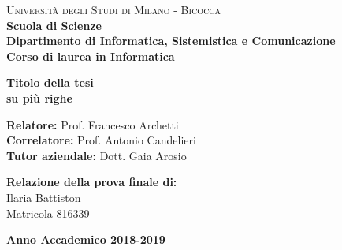 \documentclass[a4paper,12pt]{report}
\begin{document}
	
	\begin{titlepage}
		
		\begin{minipage}[t]{0.19\textwidth}
		\end{minipage}
		\begin{minipage}[t]{0.81\textwidth}
			{
				{\textsc{Università degli Studi di Milano - Bicocca}} \\
				\textbf{Scuola di Scienze} \\
				\textbf{Dipartimento di Informatica, Sistemistica e Comunicazione} \\
				\textbf{Corso di laurea in Informatica} \\
				\par
			}
		\end{minipage}
		
		\vspace{40mm}
		
		\begin{center}
			{\LARGE{
					\textbf{Titolo della tesi \\ su più righe}
					\par
			}}
		\end{center}
		
		\vspace{40mm}
		
		{\large \textbf{Relatore:} Prof. Francesco Archetti} \\
		
		{\large \textbf{Correlatore:} Prof. Antonio Candelieri} \\
		
		{\large \textbf{Tutor aziendale:} Dott. Gaia Arosio} \\
		
		\vspace{15mm}
		
		\begin{flushright}
			{\large \textbf{Relazione della prova finale di:}} \\
			\large{Ilaria Battiston} \\
			\large{Matricola 816339} 
		\end{flushright}
		
		\vspace{30mm}
		\begin{center}
			{\large{\bf Anno Accademico 2018-2019}}
		\end{center}
		
		\restoregeometry
		
	\end{titlepage}
    
\end{document}
